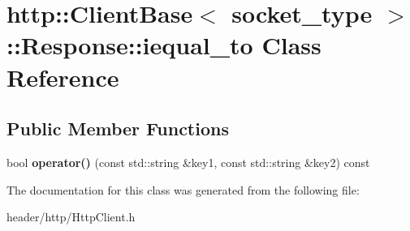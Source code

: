 \hypertarget{classhttp_1_1_client_base_1_1_response_1_1iequal__to}{}\section{http\+:\+:Client\+Base$<$ socket\+\_\+type $>$\+:\+:Response\+:\+:iequal\+\_\+to Class Reference}
\label{classhttp_1_1_client_base_1_1_response_1_1iequal__to}
\subsection*{Public Member Functions}
\begin{DoxyCompactItemize}
\item 
\mbox{\label{classhttp_1_1_client_base_1_1_response_1_1iequal__to_ae25e69dfd714ffdecd2f159cdc979131}} 
bool {\bfseries operator()} (const std\+::string \&key1, const std\+::string \&key2) const
\end{DoxyCompactItemize}


The documentation for this class was generated from the following file\+:\begin{DoxyCompactItemize}
\item 
header/http/Http\+Client.\+h\end{DoxyCompactItemize}
